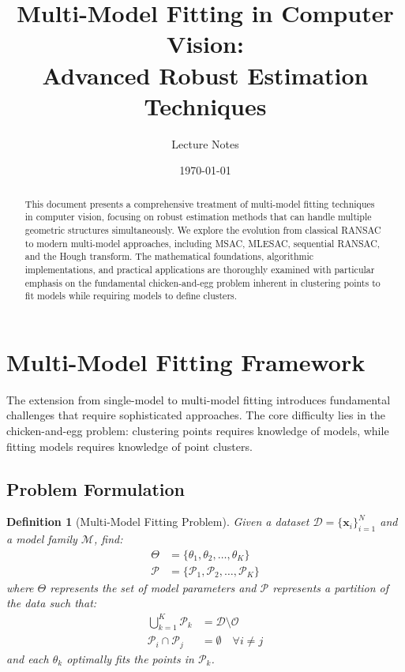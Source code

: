 \documentclass[12pt]{article}
\title{Multi-Model Fitting in Computer Vision:\\ Advanced Robust Estimation Techniques}
\author{Lecture Notes}
\date{\today}
\renewcommand{\vec}[1]{\mathbf{#1}}
\newtheorem{definition}[theorem]{Definition}
\begin{document}
\maketitle

\begin{abstract}
    This document presents a comprehensive treatment of multi-model fitting techniques in computer vision, focusing on robust estimation methods that can handle multiple geometric structures simultaneously. We explore the evolution from classical RANSAC to modern multi-model approaches, including MSAC, MLESAC, sequential RANSAC, and the Hough transform. The mathematical foundations, algorithmic implementations, and practical applications are thoroughly examined with particular emphasis on the fundamental chicken-and-egg problem inherent in clustering points to fit models while requiring models to define clusters.
\end{abstract}

\tableofcontents

\newpage
\section{Multi-Model Fitting Framework}
\label{sec:multimodel_framework}

The extension from single-model to multi-model fitting introduces fundamental challenges that require sophisticated approaches. The core difficulty lies in the chicken-and-egg problem: clustering points requires knowledge of models, while fitting models requires knowledge of point clusters.

\subsection{Problem Formulation}
\label{subsec:multimodel_formulation}

\begin{definition}[Multi-Model Fitting Problem]
    \label{def:multimodel_problem}
    Given a dataset $\mathcal{D} = \{\vec{x}_i\}_{i=1}^N$ and a model family $\mathcal{M}$, find:
    \begin{align}
        \Theta      & = \{\theta_1, \theta_2, \ldots, \theta_K\} \label{eq:model_set}                    \\
        \mathcal{P} & = \{\mathcal{P}_1, \mathcal{P}_2, \ldots, \mathcal{P}_K\} \label{eq:partition_set}
    \end{align}
    where $\Theta$ represents the set of model parameters and $\mathcal{P}$ represents a partition of the data such that:
    \begin{align}
        \bigcup_{k=1}^K \mathcal{P}_k    & = \mathcal{D} \setminus \mathcal{O} \label{eq:partition_union}   \\
        \mathcal{P}_i \cap \mathcal{P}_j & = \emptyset \quad \forall i \neq j \label{eq:partition_disjoint}
    \end{align}
    and each $\theta_k$ optimally fits the points in $\mathcal{P}_k$.
\end{definition}
\end{document}
